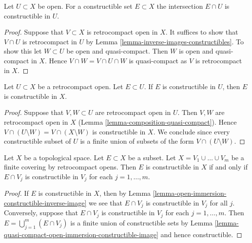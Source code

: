 \begin{lemma}
\label{lemma-open-immersion-constructible-inverse-image}
Let $U \subset X$ be open. For a constructible set
$E \subset X$ the intersection $E \cap U$ is constructible
in $U$.
\end{lemma}

\begin{proof}
Suppose that $V \subset X$ is retrocompact open in $X$.
It suffices to show that $V \cap U$ is retrocompact in $U$
by Lemma \ref{lemma-inverse-images-constructibles}. To show this
let $W \subset U$ be open and quasi-compact. Then $W$
is open and quasi-compact in $X$. Hence $V \cap W = V \cap U \cap W$
is quasi-compact as $V$ is retrocompact in $X$.
\end{proof}

\begin{lemma}
\label{lemma-quasi-compact-open-immersion-constructible-image}
Let $U \subset X$ be a retrocompact open. Let $E \subset U$.
If $E$ is constructible in $U$, then $E$ is constructible in $X$.
\end{lemma}

\begin{proof}
Suppose that $V, W \subset U$ are retrocompact open in $U$.
Then $V, W$ are retrocompact open in $X$
(Lemma \ref{lemma-composition-quasi-compact}).
Hence $V \cap (U \setminus W) = V \cap (X \setminus W)$
is constructible in $X$. We conclude since every constructible subset of $U$
is a finite union of subsets of the form $V \cap (U \setminus W)$.
\end{proof}

\begin{lemma}
\label{lemma-collate-constructible}
Let $X$ be a topological space. Let $E \subset X$ be a subset.
Let $X = V_1 \cup \ldots \cup V_m$ be a finite covering by
retrocompact opens.
Then $E$ is constructible in $X$ if and only if $E \cap V_j$
is constructible in $V_j$ for each $j = 1, \ldots, m$.
\end{lemma}

\begin{proof}
If $E$ is constructible in $X$, then by
Lemma \ref{lemma-open-immersion-constructible-inverse-image}
we see that $E \cap V_j$ is constructible in $V_j$ for all $j$.
Conversely, suppose that $E \cap V_j$
is constructible in $V_j$ for each $j = 1, \ldots, m$.
Then $E = \bigcup_{j = 1}^m (E \cap V_j)$ is a finite union of
constructible sets by
Lemma \ref{lemma-quasi-compact-open-immersion-constructible-image}
and hence constructible.
\end{proof}

